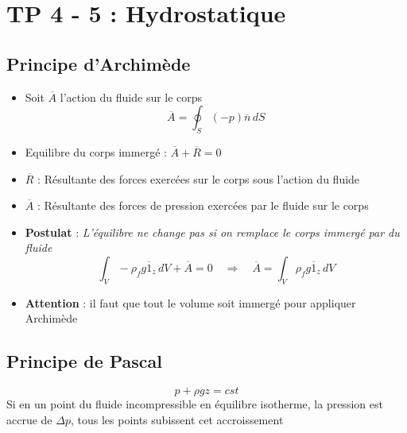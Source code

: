 \section*{TP 4 - 5 : Hydrostatique}
\subsection*{Principe d'Archimède}
\begin{itemize}
	
	\item Soit $\overline{A}$ l'action du fluide sur le corps
	      \begin{equation}
	      	\overline{A} = \oint _S (-p) \overline{n} \, dS 
	      \end{equation}
	      	
	\item Equilibre du corps immergé : $\overline{A} + \overline{R} = 0$
	\item $\overline{R}$ : Résultante des forces exercées sur le corps sous l'action du fluide
	\item $\overline{A}$ : Résultante des forces de pression exercées par le fluide sur le corps
	\item \textbf{Postulat} : \textit{L'équilibre ne change pas si on remplace le corps immergé par du fluide}
	      \begin{equation}
	      	\int _V -\rho _f g \overline{1}_z \, dV + \overline{A} = 0 \quad \Rightarrow \quad \overline{A} = \int _V \rho _f g \overline{1}_z \, dV
	      \end{equation}
	\item \textbf{Attention} : il faut que tout le volume soit immergé pour appliquer Archimède
\end{itemize}

\subsection*{Principe de Pascal}

\begin{equation}
	p + \rho g z = cst
\end{equation}
\noindent Si en un point du fluide incompressible en équilibre isotherme, la pression est accrue de $\Delta p$, tous les points subissent cet accroissement

